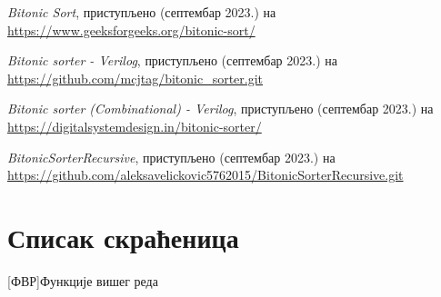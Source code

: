 \documentclass[12pt, a4paper]{article}
\theoremstyle{definition}
\begin{document}
\begin{thebibliography}{99}
\textit{Bitonic Sort}, приступљено (септембар 2023.) на
\url{https://www.geeksforgeeks.org/bitonic-sort/}

\textit{Bitonic sorter - Verilog}, приступљено (септембар 2023.) на
\url{https://github.com/mcjtag/bitonic_sorter.git}

\textit{Bitonic sorter (Combinational) - Verilog}, приступљено (септембар 2023.) на
\url{https://digitalsystemdesign.in/bitonic-sorter/}

\textit{BitonicSorterRecursive}, приступљено (септембар 2023.) на
\url{https://github.com/aleksavelickovic5762015/BitonicSorterRecursive.git}

\end{thebibliography}

\endgroup

\newpage

\section*{Списак скраћеница}
\begin{acronym}
[ФВР]{Функције вишег реда}
\end{acronym}

\listoftables

\newpage

\listoffigures
\end{document}
